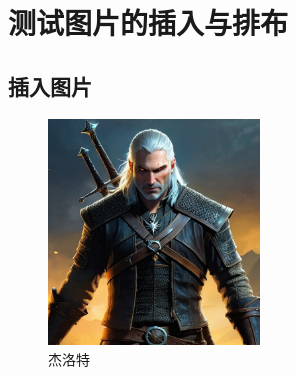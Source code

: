 \section{测试图片的插入与排布}
\subsection{插入图片}
\begin{figure}[!htb]
    \centering
    \includegraphics[width=0.5\textwidth]{./photo/Witcher_Geralt.jpg}
    \caption{杰洛特}
    \label{fig:geralt}
    \vspace{-0.5cm} %
\end{figure}

\newpage
